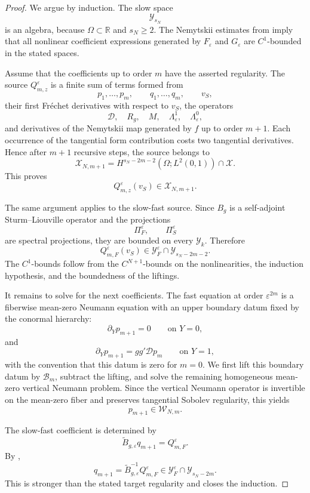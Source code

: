 \documentclass[11pt]{article}
\theoremstyle{definition}
\theoremstyle{remark}
\numberwithin{equation}{section}
\begin{document}
\begin{proof}
We argue by induction. The slow space
\[
\mathcal Y_{s_N}
\]
is an algebra, because \(\Omega\subset\mathbb R\) and \(s_N\ge2\). The
Nemytskii estimates from  imply that
all nonlinear coefficient expressions generated by \(F_\varepsilon\) and
\(G_\varepsilon\) are \(C^1\)-bounded in the stated spaces.

Assume that the coefficients up to order \(m\) have the asserted regularity.
The source \(Q_{m,z}^\varepsilon\) is a finite sum of terms formed from
\[
p_1,\dots,p_m,
\qquad
q_1,\dots,q_m,
\qquad
v_S,
\]
their first Fréchet derivatives with respect to \(v_S\), the operators
\[
\mathcal D,\quad R_g,\quad M,\quad \Lambda_\varepsilon^1,\quad
\Lambda_\varepsilon^0,
\]
and derivatives of the Nemytskii map generated by \(f\) up to order \(m+1\).
Each occurrence of the tangential form contribution costs two tangential
derivatives. Hence after \(m+1\) recursive steps, the source belongs to
\[
\mathcal X_{N,m+1}
=
H^{s_N-2m-2}(\Omega;L^2(0,1))\cap\mathcal X.
\]
This proves
\[
Q_{m,z}^\varepsilon(v_S)\in \mathcal X_{N,m+1}.
\]

The same argument applies to the slow-fast source. Since \(B_g\) is a
self-adjoint Sturm--Liouville operator and the projections
\[
\Pi_F^\varepsilon,\qquad \Pi_S^\varepsilon
\]
are spectral projections, they are bounded on every \(\mathcal Y_k\). Therefore
\[
Q_{m,F}^\varepsilon(v_S)
\in
\mathcal Y_F^\varepsilon\cap\mathcal Y_{s_N-2m-2}.
\]
The \(C^1\)-bounds follow from the \(C^{N+1}\)-bounds on the nonlinearities,
the induction hypothesis, and the boundedness of the liftings.

It remains to solve for the next coefficients. The fast equation at order
\(\varepsilon^{2m}\) is a fiberwise mean-zero Neumann equation with an upper boundary
datum fixed by the conormal hierarchy:
\[
\partial_Yp_{m+1}=0
\qquad\text{on }Y=0,
\]
and
\[
\partial_Yp_{m+1}=gg'\mathcal Dp_m
\qquad\text{on }Y=1,
\]
with the convention that this datum is zero for \(m=0\). We first lift this
boundary datum by \(\mathscr B_m\), subtract the lifting, and solve the
remaining homogeneous mean-zero vertical Neumann problem. Since the vertical
Neumann operator is invertible on the mean-zero fiber and preserves tangential
Sobolev regularity, this yields
\[
p_{m+1}\in\mathcal W_{N,m}.
\]

The slow-fast coefficient is determined by
\[
\widetilde B_{g,\varepsilon}q_{m+1}
=
Q_{m,F}^\varepsilon.
\]
By ,
\[
q_{m+1}
=
\widetilde B_{g,\varepsilon}^{-1}Q_{m,F}^\varepsilon
\in
\mathcal Y_F^\varepsilon\cap\mathcal Y_{s_N-2m}.
\]
This is stronger than the stated target regularity and closes the induction.
\end{proof}
\end{document}
